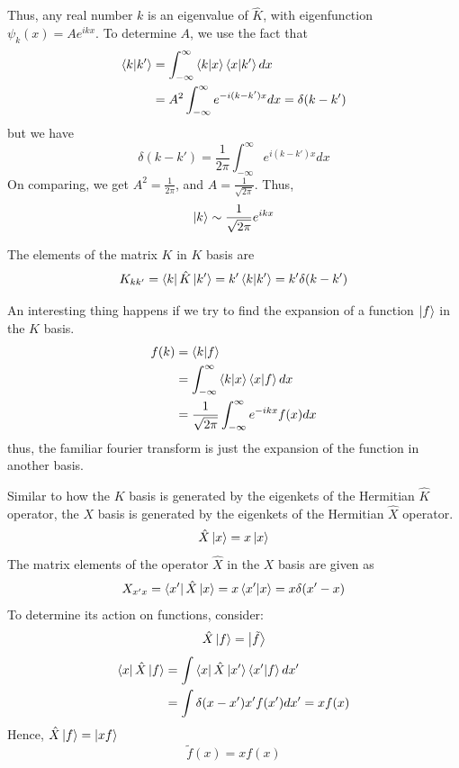 \documentclass[12pt,a4paper]{report}
\begin{document}
Thus, any real number $k$ is an eigenvalue of $\hat{K}$, with eigenfunction $\psi_k(x) = Ae^{ikx}$. To determine $A$, we use the fact that
\begin{align*}
    \bra{k}\ket{k'} &= \int_{-\infty}^{\infty} \bra{k}\ket{x}\bra{x}\ket{k'} dx \\
    &= A^2\int_{-\infty}^{\infty} e^{-i(k-k')x} dx = \delta(k-k')
\end{align*}
but we have
\begin{equation*}
    \delta(k-k') = \frac{1}{2\pi}\int_{-\infty}^{\infty}e^{i(k-k')x} dx
\end{equation*}
On comparing, we get $A^2 = \frac{1}{2\pi}$, and $A = \frac{1}{\sqrt{2\pi}}$. Thus,
\begin{equation*}
    \ket{k} \sim \frac{1}{\sqrt{2\pi}} e^{ikx}
\end{equation*}

The elements of the matrix $K$ in $K$ basis are
\begin{equation*}
    K_{kk'} = \bra{k}\hat{K}\ket{k'} = k'\bra{k}\ket{k'} = k'\delta(k-k')
\end{equation*}

An interesting thing happens if we try to find the expansion of a function $\ket{f}$ in the $K$ basis.
\begin{align*}
    f(k) &= \bra{k}\ket{f} \\
    &= \int_{-\infty}^{\infty} \bra{k}\ket{x}\bra{x}\ket{f} dx \\
    &= \frac{1}{\sqrt{2\pi}}\int_{-\infty}^{\infty} e^{-ikx}f(x) dx \\
\end{align*}
thus, the familiar fourier transform is just the expansion of the function in another basis.

Similar to how the $K$ basis is generated by the eigenkets of the Hermitian $\hat{K}$ operator, the $X$ basis is generated by the eigenkets of the Hermitian $\hat{X}$ operator.
\begin{equation*}
    \hat{X}\ket{x} = x\ket{x}
\end{equation*}
The matrix elements of the operator $\hat{X}$ in the $X$ basis are given as
\begin{equation*}
    X_{x'x} = \bra{x'}\hat{X}\ket{x} = x\bra{x'}\ket{x} = x\delta(x'-x)
\end{equation*}
To determine its action on functions, consider:
\begin{equation*}
    \hat{X}\ket{f} = \ket{\tilde{f}}
\end{equation*}
\begin{align*}
    \bra{x}\hat{X}\ket{f} &= \int \bra{x}\hat{X}\ket{x'}\bra{x'}\ket{f} dx' \\
    &= \int\delta(x-x')x'f(x') dx' = xf(x)
\end{align*}
Hence, $\hat{X}\ket{f} = \ket{xf}$
\begin{equation*}
    \tilde{f}(x) = xf(x)
\end{equation*}
\end{document}
